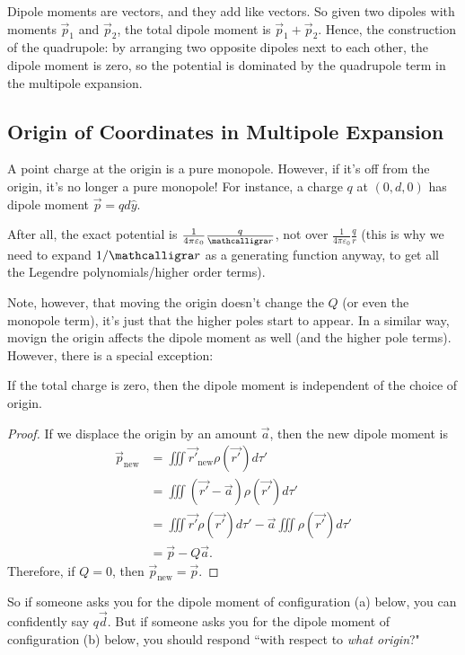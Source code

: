 Dipole moments are vectors, and they add like vectors. So given two dipoles with moments $\vec{p}_1$ and $\vec{p}_2$, the total dipole moment is $\vec{p}_1+\vec{p}_2$. Hence, the construction of the quadrupole: by arranging two opposite dipoles next to each other, the dipole moment is zero, so the potential is dominated by the quadrupole term in the multipole expansion.

\subsection{Origin of Coordinates in Multipole Expansion}

A point charge at the origin is a pure monopole. However, if it's off from the origin, it's no longer a pure monopole! For instance, a charge $q$ at $(0,d,0)$ has dipole moment $\vec{p}=qd\hat{y}$.

After all, the exact potential is $\frac{1}{4\pi\varepsilon_0}\frac{q}{\scr}$, not over $\frac{1}{4\pi\varepsilon_0}\frac{q}{r}$ (this is why we need to expand $1/\scr$ as a generating function anyway, to get all the Legendre polynomials/higher order terms).

Note, however, that moving the origin doesn't change the  $Q$ (or even the monopole term), it's just that the higher poles start to appear. In a similar way, movign the origin affects the dipole moment as well (and the higher pole terms). However, there is a special exception:

\begin{claim}
If the total charge is zero, then the dipole moment is independent of the choice of origin.
\end{claim}

\begin{proof}
If we displace the origin by an amount $\vec{a}$, then the new dipole moment is
\begin{align*}
\vec{p}_{\text{new}}&=\iiint \vec{r'}_{\text{new}}\rho(\vec{r'})d\tau'\\
&=\iiint (\vec{r'}-\vec{a})\rho(\vec{r'})d\tau'\\
&=\iiint \vec{r'}\rho(\vec{r'})d\tau'-\vec{a}\iiint\rho(\vec{r'})d\tau'\\
&=\vec{p}-Q\vec{a}.
\end{align*}
Therefore, if $Q=0$, then $\vec{p}_{\text{new}}=\vec{p}$.
\end{proof}

So if someone asks you for the dipole moment of configuration (a) below, you can confidently say $q\vec{d}$. But if someone asks you for the dipole moment of configuration (b) below, you should respond ``with respect to \textit{what origin}?"


